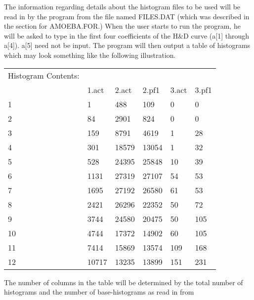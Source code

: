        The information regarding details about the histogram files to be
   used will be read in by the program from the file named FILES.DAT
   (which was described in the section for AMOEBA.FOR.)  When the user
   starts to run the program, he will be asked to type in the first four
   coefficients of the H\&D curve (a[1] through a[4]).  a[5] need not be
   input.  The program will then output a table of histograms which may
   look something like the following illustration.
\begin{center}
\begin{tabular}{||l|l|l|l|l|l||}
\hline   
        Histogram Contents: &  &  &  &  & \\                                        
             &     1.act  &    2.act  &    2.pf1  &    3.act   &   3.pf1  \\
          1  &         1  &      488  &      109  &        0 &         0 \\
          2  &        84 &      2901 &       824 &         0 &         0 \\
          3  &       159 &       8791 &      4619  &         1 &        28  \\
          4  &       301 &      18579 &      13054 &          1 &        32  \\
          5  &       528 &      24395 &      25848 &         10 &         39 \\ 
          6  &      1131  &    27319   &   27107    &     54    &     53  \\
          7  &      1695  &    27192   &   26580    &     61    &     53  \\
          8  &      2421  &    26296   &   22352    &     50    &     72  \\
          9  &      3744  &    24580   &   20475    &     50    &    105  \\
         10 &       4744  &    17372   &   14902    &     60    &    105  \\
         11 &       7414  &    15869   &   13574    &    109    &    168  \\
         12 &      10717 &     13235   &   13899    &    151    &    231  \\
\hline
\end{tabular}                                                             
\end{center}                                                                    
       The number of columns in the table will be determined by the total
   number of histograms and the number of base-histograms as read in from
